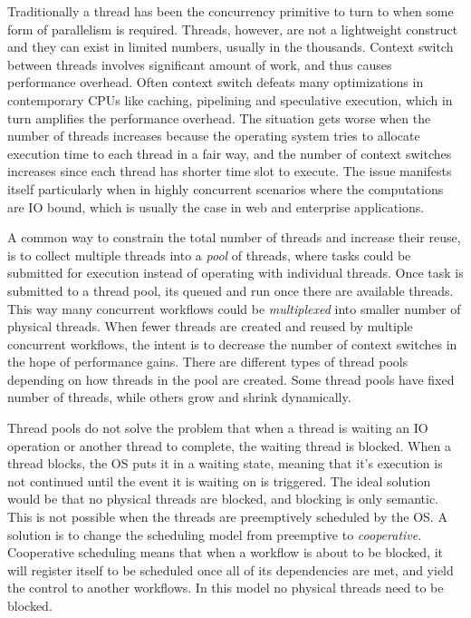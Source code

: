 Traditionally a thread has been the concurrency primitive to turn to when some form of parallelism is required. Threads, however, are not a lightweight construct and they can exist in limited numbers, usually in the thousands. Context switch between threads involves significant amount of work, and thus causes performance overhead. Often context switch defeats many optimizations in contemporary CPUs like caching, pipelining and speculative execution, which in turn amplifies the performance overhead. The situation gets worse when the number of threads increases because the operating system tries to allocate execution time to each thread in a fair way, and the number of context switches increases since each thread has shorter time slot to execute. The issue manifests itself particularly when in highly concurrent scenarios where the computations are IO bound, which is usually the case in web and enterprise applications.

A common way to constrain the total number of threads and increase their reuse, is to collect multiple threads into a \textit{pool} of threads, where tasks could be submitted for execution instead of operating with individual threads. Once task is submitted to a thread pool, its queued and run once there are available threads. This way many concurrent workflows could be \textit{multiplexed} into smaller number of physical threads. When fewer threads are created and reused by multiple concurrent workflows, the intent is to decrease the number of context switches in the hope of performance gains. There are different types of thread pools depending on how threads in the pool are created. Some thread pools have fixed number of threads, while others grow and shrink dynamically.

Thread pools do not solve the problem that when a thread is waiting an IO operation or another thread to complete, the waiting thread is blocked. When a thread blocks, the OS puts it in a waiting state, meaning that it's execution is not continued until the event it is waiting on is triggered. The ideal solution would be that no physical threads are blocked, and blocking is only semantic. This is not possible when the threads are preemptively scheduled by the OS. A solution is to change the scheduling model from preemptive to \textit{cooperative}. Cooperative scheduling means that when a workflow is about to be blocked, it will register itself to be scheduled once all of its dependencies are met, and yield the control to another workflows. In this model no physical threads need to be blocked.

